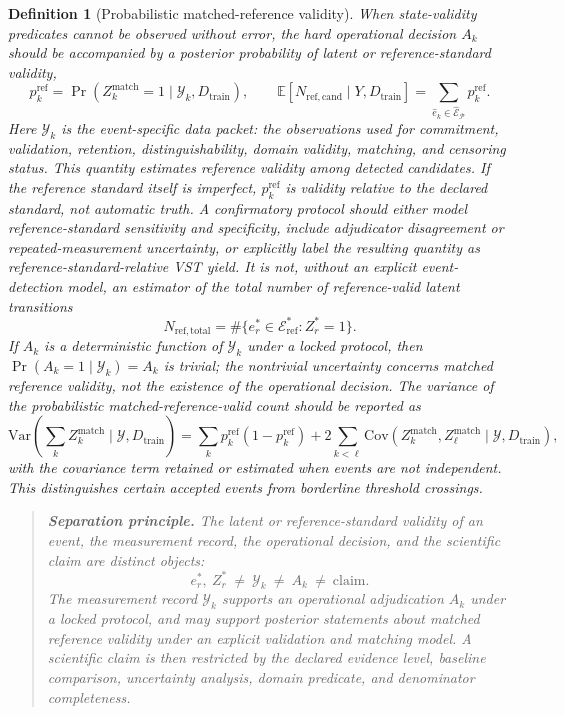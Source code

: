 \documentclass[11pt,a4paper]{article}
\newtheorem{definition}{Definition}
\newcommand{\E}{\mathbb{E}}
\newcommand{\1}{\mathbf{1}}
\begin{document}
\begin{definition}[Probabilistic matched-reference validity]
When state-validity predicates cannot be observed without error, the hard operational decision $A_k$ should be accompanied by a posterior probability of latent or reference-standard validity,
\[
  p_k^{\mathrm{ref}}=\Pr(Z^{\mathrm{match}}_k=1\mid \mathcal{Y}_k,D_{\mathrm{train}}),
  \qquad
  \E[N_{\mathrm{ref,cand}}\mid Y,D_{\mathrm{train}}]=\sum_{\hat e_k\in\widehat{\mathcal{E}}_{\mathcal{P}}} p_k^{\mathrm{ref}}.
\]
Here $\mathcal{Y}_k$ is the event-specific data packet: the observations used for commitment, validation, retention, distinguishability, domain validity, matching, and censoring status. This quantity estimates reference validity among detected candidates. If the reference standard itself is imperfect, $p_k^{\mathrm{ref}}$ is validity relative to the declared standard, not automatic truth. A confirmatory protocol should either model reference-standard sensitivity and specificity, include adjudicator disagreement or repeated-measurement uncertainty, or explicitly label the resulting quantity as reference-standard-relative VST yield. It is not, without an explicit event-detection model, an estimator of the total number of reference-valid latent transitions
\[
  N_{\mathrm{ref,total}}=\#\{e_r^\ast\in\mathcal{E}^{\ast}_{\mathrm{ref}}:Z_r^\ast=1\}.
\]
If $A_k$ is a deterministic function of $\mathcal{Y}_k$ under a locked protocol, then $\Pr(A_k=1\mid\mathcal{Y}_k)=A_k$ is trivial; the nontrivial uncertainty concerns matched reference validity, not the existence of the operational decision. The variance of the probabilistic matched-reference-valid count should be reported as
\[
  \mathrm{Var}\!\left(\sum_k Z^{\mathrm{match}}_k\mid \mathcal{Y},D_{\mathrm{train}}\right)
  =
  \sum_k p_k^{\mathrm{ref}}(1-p_k^{\mathrm{ref}})
  +2\sum_{k<\ell}\mathrm{Cov}(Z^{\mathrm{match}}_k,Z^{\mathrm{match}}_\ell\mid \mathcal{Y},D_{\mathrm{train}}),
\]
with the covariance term retained or estimated when events are not independent. This distinguishes certain accepted events from borderline threshold crossings.

\begin{quote}
\textbf{Separation principle.} The latent or reference-standard validity of an event, the measurement record, the operational decision, and the scientific claim are distinct objects:
\[
  e_r^\ast,\ Z_r^\ast\ \neq\ \mathcal{Y}_k\ \neq\ A_k\ \neq\ \mathrm{claim}.
\]
The measurement record $\mathcal{Y}_k$ supports an operational adjudication $A_k$ under a locked protocol, and may support posterior statements about matched reference validity under an explicit validation and matching model. A scientific claim is then restricted by the declared evidence level, baseline comparison, uncertainty analysis, domain predicate, and denominator completeness.
\end{quote}


\end{definition}
\end{document}
